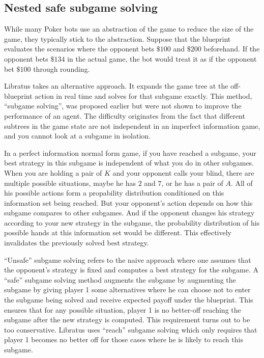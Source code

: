 \documentclass[10pt,a4paper]{article}
\begin{document}
\subsection{Nested safe subgame solving}
While many Poker bots use an abstraction of the game to reduce the size of the game, they typically stick to the abstraction. Suppose that the blueprint evaluates the scenarios where the opponent bets $\$100$ and $\$200$ beforehand. If the opponent bets $\$134$ in the actual game, the bot would treat it as if the opponent bet $\$100$ through rounding. 

Libratus takes an alternative approach. It expands the game tree at the off-blueprint action in real time and solves for that subgame exactly. This method, ``subgame solving'', was proposed earlier but were not shown to improve the performance of an agent. The difficulty originates from the fact that different subtrees in the game state are not independent in an imperfect information game, and you cannot look at a subgame in isolation. 

In a perfect information normal form game, if you have reached a subgame, your best strategy in this subgame is independent of what you do in other subgames. When you are holding a pair of $K$ and your opponent calls your blind, there are multiple possible situations, maybe he has $2$ and $7$, or he has a pair of $A$. All of his possible actions form a propability distribution conditioned on this information set being reached. But your opponent's action depends on how this subgame compares to other subgames. And if the opponent changes his strategy according to your new strategy in the subgame, the probability distribution of his possible hands at this information set would be different. This effectively invalidates the previously solved best strategy.

``Unsafe'' subgame solving refers to the naive approach where one assumes that the opponent's strategy is fixed and computes a best strategy for the subgame. A ``safe'' subgame solving method augments the subgame by augmenting the subgame by giving player 1 some alternatives where he can choose not to enter the subgame being solved and receive expected payoff under the blueprint. This ensures that for any possible situation, player 1 is no better-off reaching the subgame after the new strategy is computed. This requirement turns out to be too conservative. Libratus uses ``reach'' subgame solving which only requires that player 1 becomes no better off for those cases where he is likely to reach this subgame.
\end{document}
